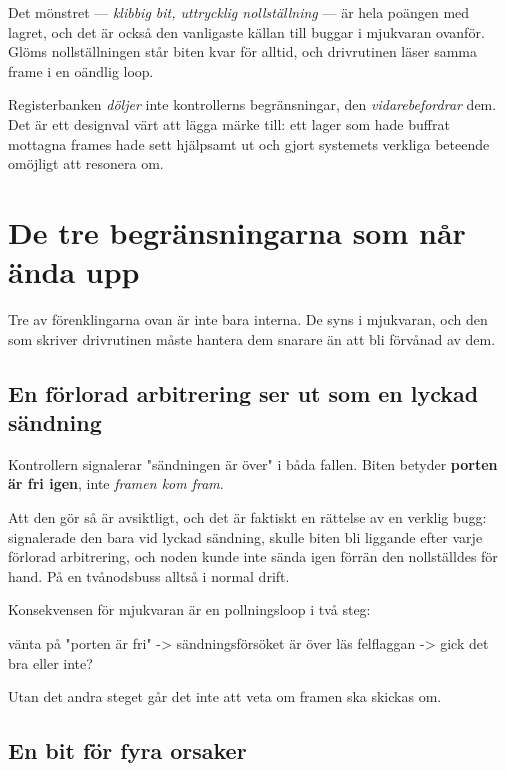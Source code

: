 Det mönstret --- \emph{klibbig bit, uttrycklig nollställning} --- är hela poängen med lagret, och det
är också den vanligaste källan till buggar i mjukvaran ovanför. Glöms nollställningen står biten
kvar för alltid, och drivrutinen läser samma frame i en oändlig loop.

\begin{aside}
\note Registerbanken \emph{döljer} inte kontrollerns begränsningar, den \emph{vidarebefordrar} dem.
Det är ett designval värt att lägga märke till: ett lager som hade buffrat mottagna frames hade
sett hjälpsamt ut och gjort systemets verkliga beteende omöjligt att resonera om.
\end{aside}

\section{De tre begränsningarna som når ända upp}

Tre av förenklingarna ovan är inte bara interna. De syns i mjukvaran, och den som skriver
drivrutinen måste hantera dem snarare än att bli förvånad av dem.

\subsection{En förlorad arbitrering ser ut som en lyckad sändning}

Kontrollern signalerar "sändningen är över" i båda fallen. Biten betyder \textbf{porten är fri
igen}, inte \emph{framen kom fram}.

Att den gör så är avsiktligt, och det är faktiskt en rättelse av en verklig bugg: signalerade den
bara vid lyckad sändning, skulle biten bli liggande efter varje förlorad arbitrering, och noden
kunde inte sända igen förrän den nollställdes för hand. På en tvånodsbuss alltså i normal drift.

Konsekvensen för mjukvaran är en pollningsloop i två steg:

\begin{console}
vänta på "porten är fri"   -> sändningsförsöket är över
läs felflaggan             -> gick det bra eller inte?
\end{console}

Utan det andra steget går det inte att veta om framen ska skickas om.

\subsection{En bit för fyra orsaker}

